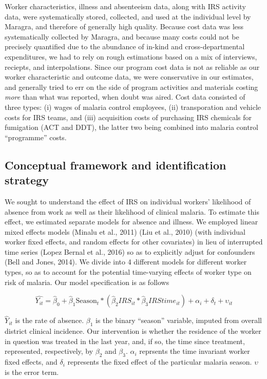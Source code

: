 \documentclass[]{article}
\begin{document}
Worker characteristics, illness and absenteeism data, along with IRS
activity data, were systematically stored, collected, and used at the
individual level by Maragra, and therefore of generally high quality.
Because cost data was less systematically collected by Maragra, and
because many costs could not be precisely quantified due to the
abundance of in-kind and cross-departmental expenditures, we had to rely
on rough estimations based on a mix of interviews, reciepts, and
interpolations. Since our program cost data is not as reliable as our
worker characteristic and outcome data, we were conservative in our
estimates, and generally tried to err on the side of program activities
and materials costing \emph{more} than what was reported, when doubt was
aired. Cost data consisted of three types: (i) wages of malaria control
employees, (ii) transporation and vehicle costs for IRS teams, and (iii)
acquisition costs of purchasing IRS chemicals for fumigation (ACT and
DDT), the latter two being combined into malaria control ``programme''
costs.

\subsection{Conceptual framework and identification
strategy}\label{conceptual-framework-and-identification-strategy}

We sought to understand the effect of IRS on individual workers'
likelihood of absence from work as well as their likelihood of clinical
malaria. To estimate this effect, we estimated separate models for
absence and illness. We employed linear mixed effects models (Minalu et
al., 2011) (Liu et al., 2010) (with individual worker fixed effects, and
random effects for other covariates) in lieu of interrupted time series
(Lopez Bernal et al., 2016) so as to explicitly adjust for confounders
(Bell and Jones, 2014). We divide into 4 different models for different
worker types, so as to account for the potential time-varying effects of
worker type on risk of malaria. Our model specification is as follows

\[
\hat{Y_{it}} = \hat{\beta}_{0} +  \hat{\beta}_{1}\text{Season}_{t} * (\hat{\beta}_2{IRS_{it}}*\hat{\beta}_3{IRStime_{it}}) + \alpha_i + \delta_t + \upsilon_{it}
\]

\(\hat{Y}_{it}\) is the rate of absence. \(\beta_{1}\) is the binary
``season'' variable, imputed from overall district clinical incidence.
Our intervention is whether the residence of the worker in question was
treated in the last year, and, if so, the time since treatment,
represented, respectively, by \(\beta_{2}\) and \(\beta_{3}\).
\(\alpha_i\) reprsents the time invariant worker fixed effects, and
\(\delta_i\) represents the fixed effect of the particular malaria
season. \(\upsilon\) is the error term.
\end{document}
